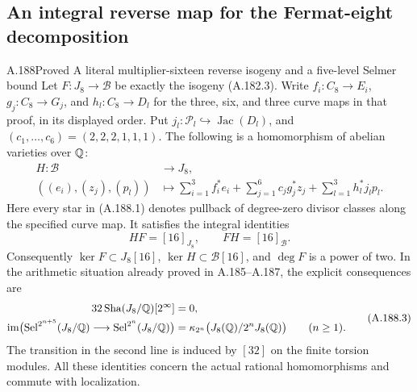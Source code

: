\subsection{An integral reverse map for the Fermat-eight decomposition}

\begin{statement}{A.188}{Proved}
{A literal multiplier-sixteen reverse isogeny and a five-level Selmer bound}
Let \(F:J_8\to\mathcal B\) be exactly the isogeny
(A.182.3).  Write \(f_i:C_8\to E_i\),
\(g_j:C_8\to G_j\), and \(h_l:C_8\to D_l\)
for the three, six, and three curve maps in that proof,
in its displayed order.  Put
\(j_l:\mathcal P_l\hookrightarrow\operatorname{Jac}(D_l)\),
and \((c_1,\ldots,c_6)=(2,2,2,1,1,1)\).
The following is a homomorphism of abelian varieties over \(\mathbb Q\):
\[
\begin{aligned}
 H:\mathcal B&\longrightarrow J_8,\\
 ((e_i),(z_j),(p_l))&\longmapsto
    \sum_{i=1}^3 f_i^*e_i
       +\sum_{j=1}^6 c_jg_j^*z_j
       +\sum_{l=1}^3 h_l^*j_lp_l.
\end{aligned}
\tag{A.188.1}
\]
Here every star in (A.188.1) denotes pullback of degree-zero
divisor classes along the specified curve map.  It satisfies
the integral identities
\[
                HF=[16]_{J_8},\qquad FH=[16]_{\mathcal B}.
\tag{A.188.2}
\]
Consequently \(\ker F\subset J_8[16]\),
\(\ker H\subset\mathcal B[16]\), and \(\deg F\)
is a power of two.  In the arithmetic situation already proved
in A.185--A.187, the explicit consequences are
\[
\begin{aligned}
 32\operatorname{Sha}(J_8/\mathbb Q)[2^\infty]&=0,\\
 \operatorname{im}\bigl(
   \operatorname{Sel}^{2^{n+5}}(J_8/\mathbb Q)
       \longrightarrow\operatorname{Sel}^{2^n}(J_8/\mathbb Q)\bigr)
   &=\kappa_{2^n}\bigl(J_8(\mathbb Q)/2^nJ_8(\mathbb Q)\bigr)
       \qquad(n\geq1).
\end{aligned}
\tag{A.188.3}
\]
The transition in the second line is induced by \([32]\)
on the finite torsion modules.  All these identities concern
the actual rational homomorphisms and commute with localization.
\end{statement}

